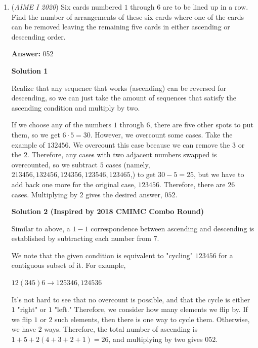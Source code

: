 \begin{enumerate}
 Here, \textbf{Juxtaposition} is directly used in terms of altering the digits, showing that we may form a specific number $O^\mathcal{x}$ and remove the digits 2, 0, 2, 0 in the same order, and the resulting number must also divide the original number $O$ given that $\mathcal{N}$ is not altered. This forms a bijection, and one can then show by special usage of juxtapositions that a special orientation forces $\mathcal{N}$ as a factor of 2020, hence proven. $\square$



	\item (\textit{AIME I 2020}) Six cards numbered $1$ through $6$ are to be lined up in a row. Find the number of arrangements of these six cards where one of the cards can be removed leaving the remaining five cards in either ascending or descending order.


 
 \textbf{Answer: }052



\textbf{Solution 1}

Realize that any sequence that works (ascending) can be reversed for descending, so we can just take the amount of sequences that satisfy the ascending condition and multiply by two.

 If we choose any of the numbers $1$ through $6$, there are five other spots to put them, so we get $6 \cdot 5 = 30$. However, we overcount some cases. Take the example of $132456$. We overcount this case because we can remove the $3$ or the $2$. Therefore, any cases with two adjacent numbers swapped is overcounted, so we subtract $5$ cases (namely, $213456, 132456, 124356, 123546, 123465$,) to get $30-5=25$, but we have to add back one more for the original case, $123456$. Therefore, there are $26$ cases. Multiplying by $2$ gives the desired answer, $\boxed{052}$.

 



\textbf{Solution 2 (Inspired by 2018 CMIMC Combo Round)}

Similar to above, a $1-1$ correspondence between ascending and descending is established by subtracting each number from $7$.

 We note that the given condition is equivalent to "cycling" $123456$ for a contiguous subset of it. For example, 

 $12(345)6 \rightarrow 125346, 124536$

 It's not hard to see that no overcount is possible, and that the cycle is either $1$ "right" or $1$ "left." Therefore, we consider how many elements we flip by. If we flip $1$ or $2$ such elements, then there is one way to cycle them. Otherwise, we have $2$ ways. Therefore, the total number of ascending is $1 + 5 + 2(4 + 3 + 2 + 1) = 26$, and multiplying by two gives $\boxed{052}.$





\end{enumerate}
